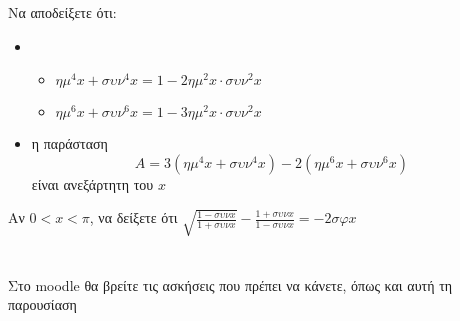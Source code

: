 \documentclass{../presentation}
\begin{document}
\begin{askisi}
  Να αποδείξετε ότι:
  \begin{itemize}
    \item \begin{itemize}
            \item $ημ^4x+συν^4x=1-2ημ^2x\cdot συν^2x$
            \item $ημ^6x+συν^6x=1-3ημ^2x\cdot συν^2x$
          \end{itemize}
    \item η παράσταση
          $$Α=3(ημ^4x+συν^4x)-2(ημ^6x+συν^6x)$$
          είναι ανεξάρτητη του $x$
  \end{itemize}

\end{askisi}

\begin{askisi}
  Αν $0<x<π$, να δείξετε ότι $\sqrt{\frac{1-συνx}{1+συνx}}-\frac{1+συνx}{1-συνx}=-2σφx$

\end{askisi}

\section{}
\begin{frame}
  Στο moodle θα βρείτε τις ασκήσεις που πρέπει να κάνετε, όπως και αυτή τη παρουσίαση
\end{frame}

\end{document}
